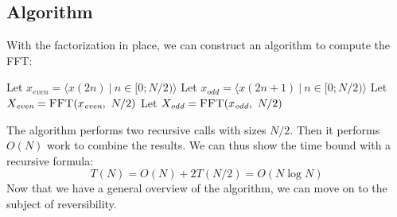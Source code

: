 \subsection{Algorithm}
With the factorization in place,
we can construct an algorithm to compute the FFT:

\begin{algorithm}[H]
    \DontPrintSemicolon
    \caption{$\textsc{FFT}(x, N)$}
    Let $x_\textit{even} = \langle x(2n) ~|~ n \in [0;N/2) \rangle$\;
    Let $x_\textit{odd} = \langle x(2n + 1) ~|~ n \in [0;N/2) \rangle$\;
    Let $X_\textit{even} = \textsc{FFT}(x_\textit{even}, ~N/2)$\;
    Let $X_\textit{odd} = \textsc{FFT}(x_\textit{odd}, ~N/2)$\;
\end{algorithm}

The algorithm performs two recursive calls with sizes $N/2$.
Then it performs $O(N)$ work to combine the results.
We can thus show the time bound with a recursive formula:
\begin{equation}
    T(N) = O(N) + 2T(N/2) = O(N \log N)
\end{equation}
Now that we have a general overview of the algorithm,
we can move on to the subject of reversibility.

